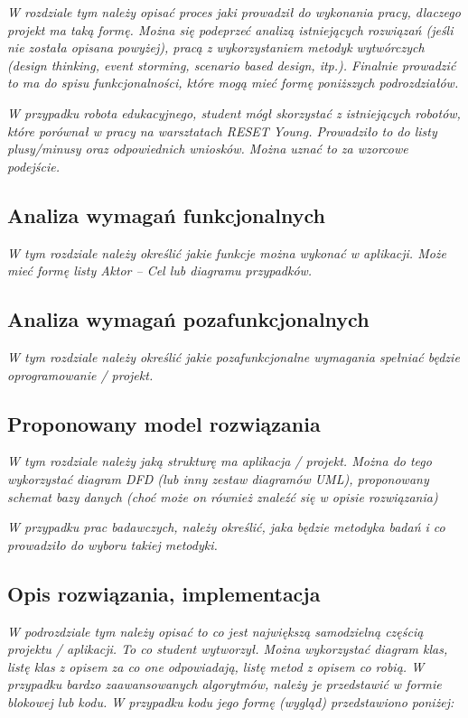 \textit{W rozdziale tym należy opisać proces jaki prowadził do wykonania pracy, dlaczego projekt ma taką formę. Można się podeprzeć analizą istniejących rozwiązań (jeśli nie została opisana powyżej), pracą z wykorzystaniem metodyk wytwórczych (design thinking, event storming, scenario based design, itp.). Finalnie prowadzić to ma do spisu funkcjonalności, które mogą mieć formę poniższych podrozdziałów.}

\textit{W przypadku robota edukacyjnego, student mógł skorzystać z istniejących robotów, które porównał w pracy na warsztatach RESET Young. Prowadziło to do listy plusy/minusy oraz odpowiednich wniosków. Można uznać to za wzorcowe podejście.}

\subsection{Analiza wymagań funkcjonalnych}
\textit{W tym rozdziale należy określić jakie funkcje można wykonać w aplikacji. Może mieć formę listy Aktor – Cel lub diagramu przypadków.}

\subsection{Analiza wymagań pozafunkcjonalnych}
\textit{W tym rozdziale należy określić jakie pozafunkcjonalne wymagania spełniać będzie oprogramowanie / projekt.}

\subsection{Proponowany model rozwiązania}
\textit{W tym rozdziale należy jaką strukturę ma aplikacja / projekt. Można do tego wykorzystać diagram DFD (lub inny zestaw diagramów UML), proponowany schemat bazy danych (choć może on również znaleźć się w opisie rozwiązania)}

\textit{W przypadku prac badawczych, należy określić, jaka będzie metodyka badań i co prowadziło do wyboru takiej metodyki.}

\subsection{Opis rozwiązania, implementacja}
\textit{W podrozdziale tym należy opisać to co jest największą samodzielną częścią projektu / aplikacji. To co student wytworzył. Można wykorzystać diagram klas, listę klas z opisem za co one odpowiadają, listę metod z opisem co robią. W przypadku bardzo zaawansowanych algorytmów, należy je przedstawić w formie blokowej lub kodu. W przypadku kodu jego formę (wygląd) przedstawiono poniżej:}

